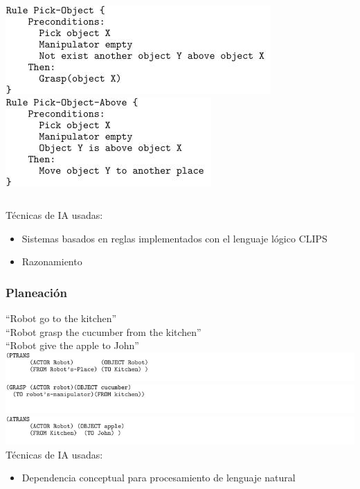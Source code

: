 \documentclass[10pt,spanish,aspectratio=1610]{beamer}
\begin{document}
\begin{frame}
\begin{columns}
    \begin{column}{0.40\textwidth}
      \includegraphics[scale=0.7]{Figures/PlanningCD7.jpg}\\
      \includegraphics[scale=0.7]{Figures/PlanningCD8.jpg}\\
    \end{column}
  \end{columns}
  \[\]
  Técnicas de IA usadas:
  \begin{itemize}
  \item Sistemas basados en reglas implementados con el lenguaje lógico CLIPS 
  \item Razonamiento 
  \end{itemize}
\end{frame}

\begin{frame}\frametitle{Planeación}
  \centering
  ``Robot go to the kitchen''\\
  ``Robot grasp the cucumber from the kitchen''\\
  ``Robot give the apple to John''
  \[\]
  \includegraphics[scale=0.7]{Figures/PlanningCD1.jpg}\\
  \includegraphics[scale=0.7]{Figures/PlanningCD2.jpg}\\
  \includegraphics[scale=0.7]{Figures/PlanningCD6.jpg}\\
  Técnicas de IA usadas:
  \begin{itemize}
  \item Dependencia conceptual para procesamiento de lenguaje natural 
  \end{itemize}
\end{frame}
\end{document}
